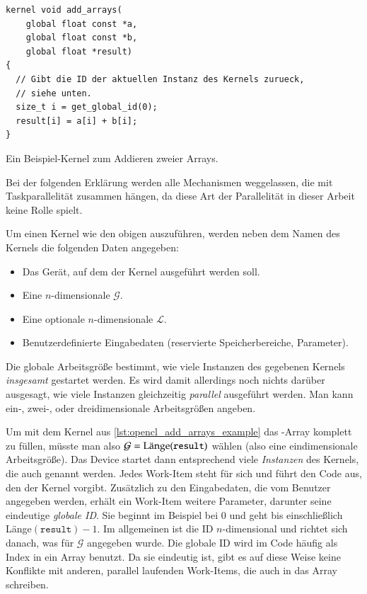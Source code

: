 \begin{listing}
    \begin{verbatim}
kernel void add_arrays(
    global float const *a,
    global float const *b,
    global float *result)
{
  // Gibt die ID der aktuellen Instanz des Kernels zurueck,
  // siehe unten.
  size_t i = get_global_id(0);
  result[i] = a[i] + b[i];
}
    \end{verbatim}
    \caption{Ein Beispiel-Kernel zum Addieren zweier Arrays.}
    \label{lst:opencl_add_arrays_example}
\end{listing}

Bei der folgenden Erklärung werden alle Mechanismen weggelassen, die
mit Taskparallelität zusammen hängen, da diese Art der Parallelität in
dieser Arbeit keine Rolle spielt.

Um einen Kernel wie den obigen auszuführen, werden neben dem Namen des
Kernels die folgenden Daten angegeben:

\begin{itemize}
\item Das Gerät, auf dem der Kernel ausgeführt werden soll.
\item Eine $n$-dimensionale  $\mathcal{G}$.
\item Eine optionale $n$-dimensionale  $\mathcal{L}$.
\item Benutzerdefinierte Eingabedaten (reservierte Speicherbereiche, Parameter).
\end{itemize}

Die globale Arbeitsgröße bestimmt, wie viele Instanzen des gegebenen
Kernels \emph{insgesamt} gestartet werden. Es wird damit allerdings
noch nichts darüber ausgesagt, wie viele Instanzen gleichzeitig
\emph{parallel} ausgeführt werden. Man kann ein-, zwei-, oder
dreidimensionale Arbeitsgrößen angeben.

Um mit dem Kernel aus
\cref{lst:opencl_add_arrays_example} das
-Array komplett zu füllen, müsste man also
$\mathcal{G}=\textnormal{Länge}(\texttt{result})$ wählen (also eine
eindimensionale Arbeitsgröße). Das Device startet dann entsprechend
viele \emph{Instanzen} des Kernels, die auch
 genannt werden. Jedes Work-Item steht für
sich und führt den Code aus, den der Kernel vorgibt. Zusätzlich zu den
Eingabedaten, die vom Benutzer angegeben werden, erhält ein Work-Item
weitere Parameter, darunter seine eindeutige \emph{globale ID}. Sie
beginnt im Beispiel bei $0$ und geht bis einschließlich
Länge$(\texttt{result})-1$. Im allgemeinen ist die ID $n$-dimensional
und richtet sich danach, was für $\mathcal{G}$ angegeben wurde. Die
globale ID wird im Code häufig als Index in ein Array benutzt. Da sie
eindeutig ist, gibt es auf diese Weise keine Konflikte mit anderen,
parallel laufenden Work-Items, die auch in das Array schreiben.

